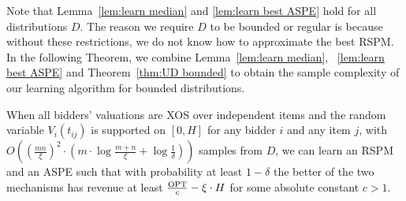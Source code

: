 Note that Lemma~\ref{lem:learn median} and \ref{lem:learn best ASPE} hold for all distributions $D$. The reason we require $D$ to be bounded or regular is because without these restrictions, we do not know how to approximate the best RSPM. In the following Theorem, we combine Lemma~\ref{lem:learn median}, ~\ref{lem:learn best ASPE} and Theorem~\ref{thm:UD bounded} to obtain the sample complexity of our learning algorithm for bounded distributions. 
\begin{theorem}\label{thm:XOS bounded}
	When all bidders' valuations are XOS over independent items and the random variable $V_i(t_{ij})$ is supported on $[0,H]$ for any bidder $i$ and any item $j$, with $O\left(\left(\frac{mn}{\xi}\right)^2 \cdot \left(m\cdot\log \frac{m+n}{\xi} + \log \frac{1}{\delta}\right)\right)$ samples from $D$, we can learn an RSPM and an ASPE such that with probability at least $1-\delta$ the better of the two mechanisms has revenue at least $\frac{\text{OPT}}{c}-\xi\cdot H$ for some absolute constant $c>1$. %
\end{theorem}
